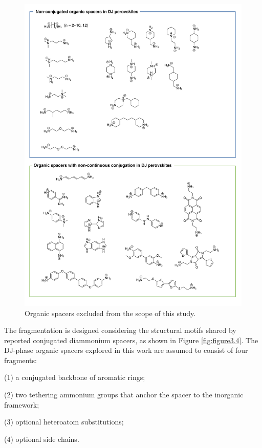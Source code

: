 \begin{figure}[htbp]
    \centering
    \includegraphics[width=\textwidth]{figures/methodology/figure3-5.pdf}
    \caption{Organic spacers excluded from the scope of this study.}
    \label{fig:figure3.5}
\end{figure}

The fragmentation is designed considering the structural motifs shared by reported conjugated diammonium spacers, as shown in Figure \ref{fig:figure3.4}. The DJ-phase organic spacers explored in this work are assumed to consist of four fragments: 

(1) a conjugated backbone of aromatic rings; 

(2) two tethering ammonium groups that anchor the spacer to the inorganic framework; 

(3) optional heteroatom substitutions;

(4) optional side chains. 

